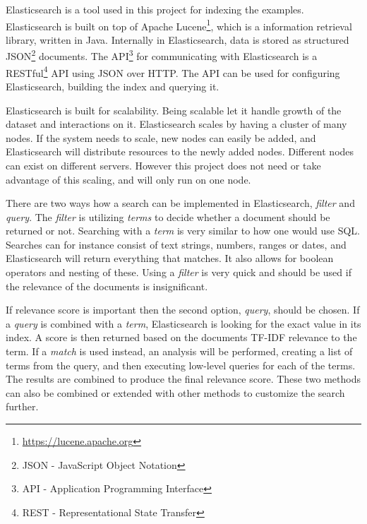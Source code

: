 Elasticsearch is a tool used in this project for indexing the examples. Elasticsearch is built on top of Apache Lucene\footnote{\url{https://lucene.apache.org}}, which is a information retrieval library, written in Java. Internally in Elasticsearch, data is stored as structured JSON\footnote{JSON - JavaScript Object Notation} documents. The API\footnote{API - Application Programming Interface} for communicating with Elasticsearch is a RESTful\footnote{REST - Representational State Transfer} API using JSON over HTTP. The API can be used for configuring Elasticsearch, building the index and querying it. 

Elasticsearch is built for scalability. Being scalable let it handle growth of the dataset and interactions on it. Elasticsearch scales by having a cluster of many nodes. If the system needs to scale, new nodes can easily be added, and Elasticsearch will distribute resources to the newly added nodes. Different nodes can exist on different servers. However this project does not need or take advantage of this scaling, and will only run on one node.

There are two ways how a search can be implemented in Elasticsearch, \textit{filter} and \textit{query}. The \textit{filter} is utilizing \textit{terms} to decide whether a document should be returned or not. Searching with a \textit{term} is very similar to how one would use SQL. 
Searches can for instance consist of text strings, numbers, ranges or dates, and Elasticsearch will return everything that matches. It also allows for boolean operators and nesting of these. Using a \textit{filter} is very quick and should be used if the relevance of the documents is insignificant.

If relevance score is important then the second option, \textit{query}, should be chosen. If a \textit{query} is combined with a \textit{term}, Elasticsearch is looking for the exact value in its index. A score is then returned based on the documents TF-IDF relevance to the term. If a \textit{match} is used instead, an analysis will be performed, creating a list of terms from the query, and then executing low-level queries for each of the terms. The results are combined to produce the final relevance score. These two methods can also be combined or extended with other methods to customize the search further.


